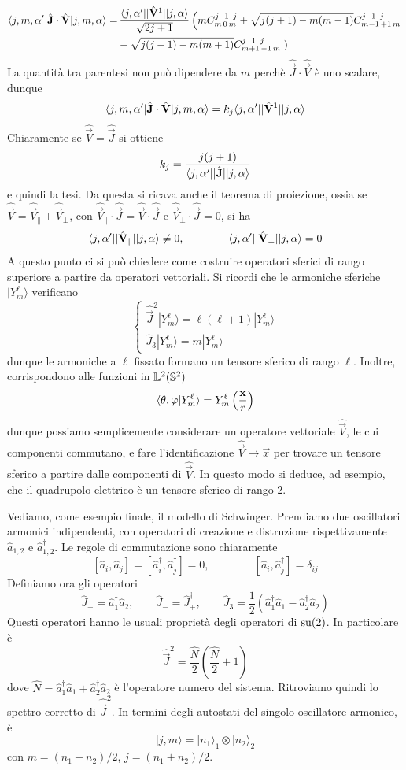 \documentclass[a4paper, 11pt]{article}
\newcommand{\op}[1]{\hat{#1}}
\renewcommand{\op}[1]{\hat{#1}}
\renewcommand{\L}{\mathbb{L}}
\renewcommand{\ket}[1]{| #1\rangle}
\begin{document}
\begin{align*}\braketop{j,m,\alpha'}{\op{\vec{J}}\cdot\op{\vec{V}}}{j,m,\alpha}=&\,\frac{\braketop{j,\alpha'}{|\op{\vec{V}}^1|}{j,\alpha}}{\sqrt{2j+1}}\left(m\tensor*{C}{^{j\,\,\,\,1\,\,\,j}_{m\,0\,m}}+\sqrt{j(j+1)-m(m-1)}\tensor*{C}{^{j\,\,\,\,1\,\,\,j}_{m-1\,+1\,m}}\right.\\&+\sqrt{j(j+1)-m(m+1)}\tensor*{C}{^{j\,\,\,\,1\,\,\,j}_{m+1\,-1\,m}}\left.\right)\end{align*}
La quantità tra parentesi non può dipendere da $m$ perchè $\op{\vec{J}}\cdot\op{\vec{V}}$ è uno scalare, dunque
\[\braketop{j,m,\alpha'}{\op{\vec{J}}\cdot\op{\vec{V}}}{j,m,\alpha}=k_j\braketop{j,\alpha'}{|\op{\vec{V}}^1|}{j,\alpha}\]
Chiaramente se $\op{\vec{V}}=\op{\vec{J}}$ si ottiene
\[k_j=\frac{j(j+1)}{\braketop{j,\alpha'}{|\op{\vec{J}}|}{j,\alpha}}\]
e quindi la tesi. Da questa si ricava anche il teorema di proiezione, ossia se $\op{\vec{V}}=\op{\vec{V}}_\parallel+\op{\vec{V}}_\perp$, con $\op{\vec{V}}_\parallel\cdot\op{\vec{J}}=\op{\vec{V}}\cdot\op{\vec{J}}$ e $\op{\vec{V}}_\perp\cdot\op{\vec{J}}=0$, si ha
\[\braketop{j,\alpha'}{|\op{\vec{V}}_\parallel|}{j,\alpha}\neq0,\qquad\qquad\braketop{j,\alpha'}{|\op{\vec{V}}_\perp|}{j,\alpha}=0\]
A questo punto ci si può chiedere come costruire operatori sferici di rango superiore a partire da operatori vettoriali. Si ricordi che le armoniche sferiche $\ket{Y^\ell_m}$ verificano
\[\begin{cases}
\op{\vec{J}}^2\ket{Y^\ell_m}=\ell(\ell+1)\ket{Y^\ell_m}\\\op J_3\ket{Y^\ell_m}=m\ket{Y^\ell_m}
\end{cases}\]
dunque le armoniche a $\ell$ fissato formano un tensore sferico di rango $\ell$. Inoltre, corrispondono alle funzioni in $\L^2(\S^2)$
\[\langle \theta,\varphi\vert Y^\ell_m\rangle=Y^\ell_m\left(\frac{\mathbf{x}}{r}\right)\]
dunque possiamo semplicemente considerare un operatore vettoriale $\op{\vec{V}}$, le cui componenti commutano, e fare l'identificazione $\op{\vec{V}}\to\vec{x}$ per trovare un tensore sferico a partire dalle componenti di $\op{\vec{V}}$. In questo modo si deduce, ad esempio, che il quadrupolo elettrico è un tensore sferico di rango 2.

Vediamo, come esempio finale, il modello di Schwinger. Prendiamo due oscillatori armonici indipendenti, con operatori di creazione e distruzione rispettivamente $\op{a}_{1,2}$ e $\op a_{1,2}^\dagger$. Le regole di commutazione sono chiaramente
\[[\op a_i,\op a_j]=[\op a_i^\dagger,\op a_j^\dagger]=0,\qquad\qquad[\op a_i,\op a_j^\dagger]=\delta_{ij}\]
Definiamo ora gli operatori
\[\op J_+=\op a_1^\dagger\op a_2,\qquad\op J_-=\op J_+^\dagger,\qquad\op J_3=\frac{1}{2}\left(\op a_1^\dagger\op a_1-\op a_2^\dagger\op a_2\right)\]
Questi operatori hanno le usuali proprietà degli operatori di $\mathrm{su}(2)$. In particolare è
\[\op{\vec{J}}^2=\frac{\op N}{2}\left(\frac{\op N}{2}+1\right)\]
dove $\op N=\op a_1^\dagger\op a_1+\op a_2^\dagger\op a_2$ è l'operatore numero del sistema. Ritroviamo quindi lo spettro corretto di $\op{\vec{J}}^2$. In termini degli autostati del singolo oscillatore armonico, è
\[\ket{j,m}=\ket{n_1}_1\otimes\ket{n_2}_2\]
con $m=(n_1-n_2)/2$, $j=(n_1+n_2)/2$.
\end{document}
